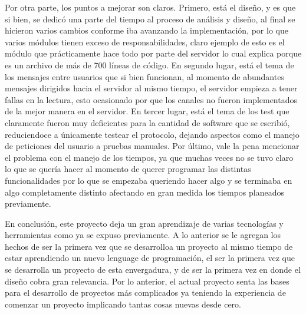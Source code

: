 \documentclass[12pt]{article}
\begin{document}
Por otra parte, los puntos a mejorar son claros. Primero, está el diseño, y es que si bien, se dedicó una parte del tiempo al proceso de análisis y diseño, al final se hicieron varios cambios conforme iba avanzando la implementación, por lo que varios módulos tienen exceso de responsabilidades, claro ejemplo de esto es el módulo \texttt{} que prácticamente hace todo por parte del servidor lo cual explica porque es un archivo de más de 700 líneas de código. En segundo lugar, está el tema de los mensajes entre usuarios que si bien funcionan, al momento de abundantes mensajes dirigidos hacia el servidor al mismo tiempo, el servidor empieza a tener fallas en la lectura, esto ocasionado por que los canales no fueron implementados de la mejor manera en el servidor. En tercer lugar, está el tema de los test que claramente fueron muy deficientes para la cantidad de software que se escribió, reduciendoce a únicamente testear el protocolo, dejando aspectos como el manejo de peticiones del usuario a pruebas manuales. Por último, vale la pena mencionar el problema con el manejo de los tiempos, ya que muchas veces no se tuvo claro lo que se quería hacer al momento de querer programar las distintas funcionalidades por lo que se empezaba queriendo hacer algo y se terminaba en algo completamente distinto afectando en gran medida los tiempos planeados previamente.

En conclusión, este proyecto deja un gran aprendizaje de varias tecnologías y herramientas como ya se expuso previamente. A lo anterior se le agregan los hechos de ser la primera vez que se desarrolloa un proyecto al mismo tiempo de estar aprendiendo un nuevo lenguage de programación, el ser la primera vez que se desarrolla un proyecto de esta envergadura, y de ser la primera vez en donde el diseño cobra gran relevancia. Por lo anterior, el actual proyecto senta las bases para el desarrollo de proyectos más complicados ya teniendo la experiencia de comenzar un proyecto implicando tantas cosas nuevas desde cero.
\end{document}

